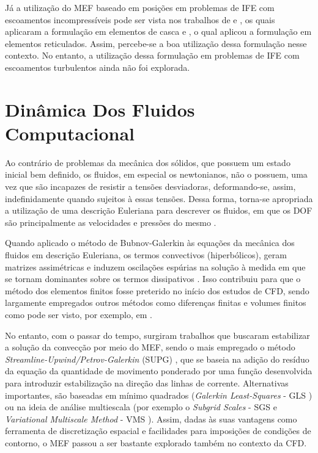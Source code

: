 Já a utilização do MEF baseado em posições em problemas de IFE com escoamentos incompressíveis pode ser vista nos trabalhos de  e , os quais aplicaram a formulação em elementos de casca e , o qual aplicou a formulação em elementos reticulados. Assim, percebe-se a boa utilização dessa formulação nesse contexto. No entanto, a utilização dessa formulação em problemas de IFE com escoamentos turbulentos ainda não foi explorada.

\section{Dinâmica Dos Fluidos Computacional} \label{CFD}

Ao contrário de problemas da mecânica dos sólidos, que possuem um estado inicial bem definido, os fluidos, em especial os newtonianos, não o possuem, uma vez que são incapazes de resistir a tensões desviadoras, deformando-se, assim, indefinidamente quando sujeitos à essas tensões. Dessa forma, torna-se apropriada a utilização de uma descrição Euleriana para descrever os fluidos, em que os DOF são principalmente as velocidades e pressões do mesmo \cite{fernandes2020tecnica}.

Quando aplicado o método de Bubnov-Galerkin às equações da mecânica dos fluidos em descrição Euleriana, os termos convectivos (hiperbólicos), geram matrizes assimétricas e induzem oscilações espúrias na solução à medida em que se tornam dominantes sobre os termos dissipativos \cite{bazilevs2013computational,brooks1982streamline}. Isso contribuiu para que o método dos elementos finitos fosse preterido no início dos estudos de CFD, sendo largamente empregados outros métodos como diferenças finitas e volumes finitos como pode ser visto, por exemplo, em .

No entanto, com o passar do tempo, surgiram trabalhos que buscaram estabilizar a solução da convecção por meio do MEF, sendo o mais empregado o método \textit{Streamline-Upwind/Petrov-Galerkin} (SUPG) \cite{brooks1982streamline}, que se baseia na adição do resíduo da equação da quantidade de movimento ponderado por uma função desenvolvida para introduzir estabilização na direção das linhas de corrente. Alternativas importantes, são baseadas em mínimo quadrados (\textit{Galerkin Least-Squares} - GLS \cite{hughes1989new,tezduyar1991stabilized}) ou na ideia de análise multiescala (por exemplo o \textit{Subgrid Scales} - SGS \cite{piomelli1999large,hughes2000large} e \textit{Variational Multiscale Method} - VMS \cite{hughes1995multiscale,hughes1998variational,hughes2000large}). Assim, dadas às suas vantagens como ferramenta de discretização espacial e facilidades para imposições de condições de contorno, o MEF passou a ser bastante explorado também no contexto da CFD.

